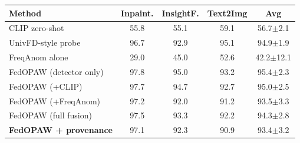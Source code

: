 \begin{tabular}{@{}lcccc@{}}
\toprule
Method & Inpaint. & InsightF. & Text2Img & Avg \\
\midrule
CLIP zero-shot & 55.8 & 55.1 & 59.1 & 56.7$\pm$2.1 \\
UnivFD-style probe & 96.7 & 92.9 & 95.1 & 94.9$\pm$1.9 \\
FreqAnom alone & 29.0 & 45.0 & 52.6 & 42.2$\pm$12.1 \\
FedOPAW (detector only) & 97.8 & 95.0 & 93.2 & 95.4$\pm$2.3 \\
FedOPAW (+CLIP) & 97.7 & 94.7 & 92.7 & 95.0$\pm$2.5 \\
FedOPAW (+FreqAnom) & 97.2 & 92.0 & 91.2 & 93.5$\pm$3.3 \\
FedOPAW (full fusion) & 97.5 & 93.3 & 92.2 & 94.3$\pm$2.8 \\
\textbf{FedOPAW + provenance} & 97.1 & 92.3 & 90.9 & 93.4$\pm$3.2 \\
\bottomrule
\end{tabular}
